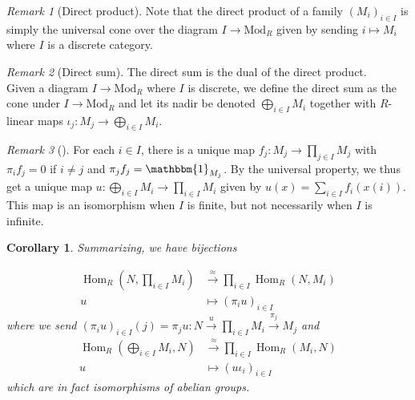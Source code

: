 \documentclass[reqno]{amsart}
\newtheorem{corollary}[theorem]{Corollary}
\theoremstyle{definition}
\theoremstyle{remark}
\newtheorem*{remark}{Remark}
\DeclareMathOperator{\Hom}{Hom}
\newcommand{\Mod}{{\mathrm{Mod}}}
\begin{document}
    \begin{remark}[Direct product]
        Note that the direct product
        of a family $\left( M_{i} \right)_{ i \in I}$
        is simply the universal cone over the
        diagram $I \to \Mod_R$ given by
        sending $i \mapsto M_i$ where $I$ is 
        a discrete category.
    \end{remark}

    \begin{remark}[Direct sum]
        The direct sum is the dual of the direct
        product.\\
        Given a diagram
        $I \to \Mod_R$ where $I$ is discrete, we
        define the direct sum as the cone
        under $I \to \Mod_R$ and let its nadir be
        denoted $\bigoplus_{i \in I} M_i$ together with
        $R$-linear maps 
        $\iota_j \colon M_j \to \bigoplus_{i \in I}M_i$.

    \end{remark}


    \begin{remark}[]
        For each $i \in I$, there is a unique map
        $f_j \colon M_j \to \prod_{j \in I} M_j$ with
        $\pi_i f_j = 0$ if $i \neq j$ and
        $\pi_j f_j = \mathbbm{1}_{M_j}$.
        By the universal property, we thus get a unique
        map
        $u \colon \bigoplus_{i \in I} M_i \to \prod_{i \in I}M_i$ 
        given by  $u \left( x \right) 
        = \sum_{i \in I} f_i\left( x(i) \right) $.
        This map is an isomorphism when $I$ is finite, but
        not necessarily when $I$ is infinite.
    \end{remark}

    \begin{corollary}
        Summarizing, we have bijections


        \begin{align*}
            \Hom_R \left( N, \prod_{i \in I} M_i \right) 
            &\stackrel{\approx}{\to} \prod_{i \in I} \Hom_R (N,M_i)\\
            u 
            &\mapsto \left( \pi_i u \right)_{i \in I}
        \end{align*}
        where we send
        $\left( \pi_i u \right)_{i \in I} (j)
        = \pi_j u \colon N \stackrel{u}{\to} \prod_{i \in I}M_i 
        \stackrel{\pi_j}{\to} 
        M_j$
        and
         \begin{align*}
            \Hom_R\left( \bigoplus_{i \in I}M_i,
            N\right) 
            &\stackrel{\approx}{\to }
            \prod_{i \in I}\Hom_R \left( M_i, N \right) \\
            u
            &\mapsto \left( u \iota_i \right)_{i \in I}
        \end{align*}
        which are in fact isomorphisms of abelian groups.
    \end{corollary}
\end{document}
